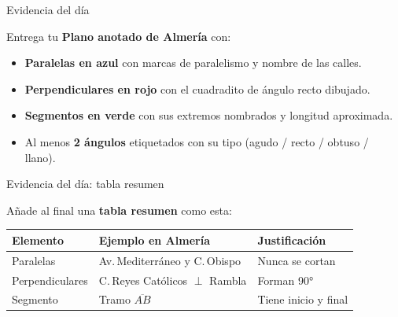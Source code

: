 \documentclass[aspectratio=169, 10pt, spanish]{beamer}
\begin{document}
\begin{frame}{Evidencia del día}
  \begin{evidenciabox}
    \AlmFontFootnote
    Entrega tu \textbf{Plano anotado de Almería} con:
    \begin{itemize}
      \item \textcolor{AlmAzulM}{\textbf{Paralelas en azul}}
            con marcas de paralelismo y nombre de las calles.
      \item \textcolor{AlmTerra}{\textbf{Perpendiculares en rojo}}
            con el cuadradito de ángulo recto dibujado.
      \item \textcolor{AlmVerde}{\textbf{Segmentos en verde}}
            con sus extremos nombrados y longitud aproximada.
      \item Al menos \textbf{2 ángulos} etiquetados con su tipo
            (agudo / recto / obtuso / llano).
    \end{itemize}
  \end{evidenciabox}
\end{frame}

\begin{frame}{Evidencia del día: tabla resumen}
  \begin{evidenciabox}
    \AlmFontFootnote
    Añade al final una \textbf{tabla resumen} como esta:
    \vspace{6pt}
    \begin{center}
      \begin{tabular}{@{}lll@{}}
        \toprule
        \textbf{Elemento} & \textbf{Ejemplo en Almería} & \textbf{Justificación}\\
        \midrule
        Paralelas & Av.\,Mediterráneo y C.\,Obispo & Nunca se cortan\\
        Perpendiculares & C.\,Reyes Católicos $\perp$ Rambla & Forman 90°\\
        Segmento & Tramo $\overline{AB}$ & Tiene inicio y final\\
        \bottomrule
      \end{tabular}
    \end{center}
  \end{evidenciabox}
\end{frame}
\end{document}
